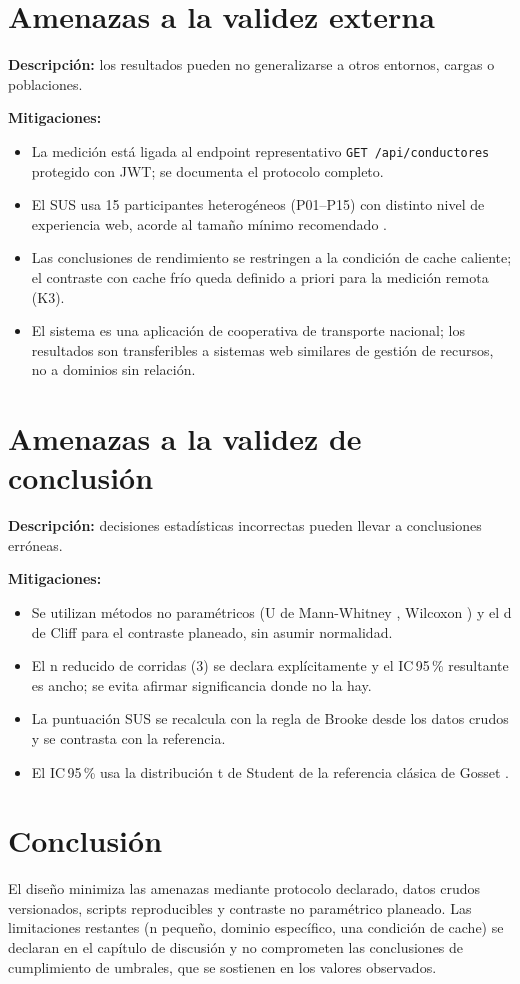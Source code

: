 \section{Amenazas a la validez externa}

\textbf{Descripción:} los resultados pueden no generalizarse a otros entornos,
cargas o poblaciones.

\textbf{Mitigaciones:}
\begin{itemize}
  \item La medición está ligada al endpoint representativo \texttt{GET /api/conductores}
        protegido con JWT; se documenta el protocolo completo.
  \item El SUS usa 15 participantes heterogéneos (P01--P15) con distinto nivel de
        experiencia web, acorde al tamaño mínimo recomendado
        \cite{kortum2013,lewis2009}.
  \item Las conclusiones de rendimiento se restringen a la condición de cache
        caliente; el contraste con cache frío queda definido a priori para la
        medición remota (K3).
  \item El sistema es una aplicación de cooperativa de transporte nacional; los
        resultados son transferibles a sistemas web similares de gestión de
        recursos, no a dominios sin relación.
\end{itemize}

\section{Amenazas a la validez de conclusión}

\textbf{Descripción:} decisiones estadísticas incorrectas pueden llevar a
conclusiones erróneas.

\textbf{Mitigaciones:}
\begin{itemize}
  \item Se utilizan métodos no paramétricos (U de Mann-Whitney \cite{mann_whitney1947},
        Wilcoxon \cite{wilcoxon1945}) y el d de Cliff \cite{cliff1993} para el
        contraste planeado, sin asumir normalidad.
  \item El n reducido de corridas (3) se declara explícitamente y el IC\,95\,\%
        resultante es ancho; se evita afirmar significancia donde no la hay.
  \item La puntuación SUS se recalcula con la regla de Brooke desde los datos
        crudos y se contrasta con la referencia.
  \item El IC\,95\,\% usa la distribución t de Student de la referencia clásica
        de Gosset \cite{student1908}.
\end{itemize}

\section{Conclusión}

El diseño minimiza las amenazas mediante protocolo declarado, datos crudos
versionados, scripts reproducibles y contraste no paramétrico planeado. Las
limitaciones restantes (n pequeño, dominio específico, una condición de cache)
se declaran en el capítulo de discusión y no comprometen las conclusiones de
cumplimiento de umbrales, que se sostienen en los valores observados.